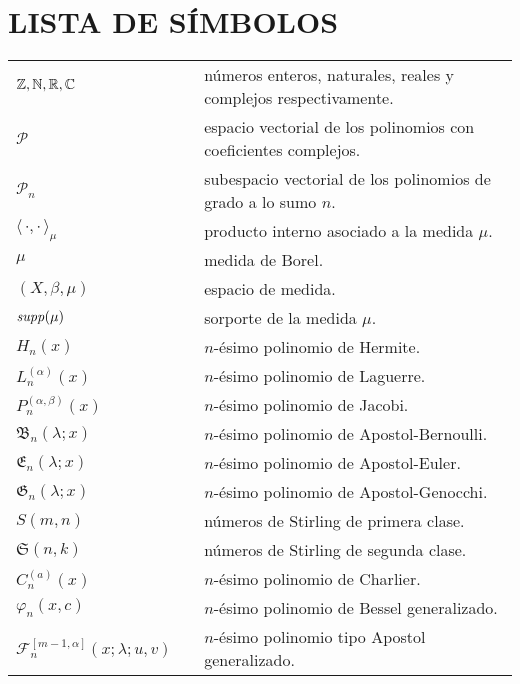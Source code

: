 \chapter*{LISTA DE S\'IMBOLOS}



\vspace{1.0cm}

\begin{tabular}{lll}
$\mathbb{Z}, \mathbb{N}, \mathbb{R}, \mathbb{C} $ & & n\'umeros enteros, naturales, reales y complejos respectivamente.\\
$\mathcal{P}$ & & espacio vectorial de los polinomios con coeficientes complejos.\\
$\mathcal{P}_n$& & subespacio vectorial de los polinomios de grado a lo sumo $n$.\\
$\langle\,\cdot,\cdot\,\rangle_{\mu}$ & & producto interno asociado a la medida $\mu$.\\
$\mu$& &medida de Borel.\\
$(X,\beta,\mu)$& & espacio de medida.\\
$\mbox{{\em supp\/}}(\mu)\;$ & & sorporte de la medida $\mu$.\\
$H_n(x)$ & & $n$-\'esimo polinomio de Hermite.\\
$L_n^{(\alpha)}(x)$ & & $n$-\'esimo polinomio de Laguerre.\\
$P_n^{(\alpha,\beta)}(x)$ & & $n$-\'esimo polinomio de Jacobi.\\
$\mathfrak{B}_n(\lambda;x)$ & & $n$-\'esimo polinomio de Apostol-Bernoulli.\\
$\mathfrak{E}_n(\lambda;x)$ & & $n$-\'esimo polinomio de Apostol-Euler.\\
$\mathfrak{G}_n(\lambda;x)$ & & $n$-\'esimo polinomio de Apostol-Genocchi.\\
$S(m,n)$ & & n\'umeros de Stirling de primera clase.\\
$\mathfrak{S}(n,k)$ & & n\'umeros de Stirling de segunda clase.\\
$C_n^{(a)}(x)$ & & $n$-\'esimo polinomio de Charlier.\\
$\varphi_n (x,c)$ & & $n$-\'esimo polinomio de Bessel generalizado.\\
$\mathcal{F}_n^{[m-1,\alpha]}(x;\lambda;u,v)$ & & $n$-\'esimo polinomio tipo Apostol generalizado.\\



\end{tabular}













